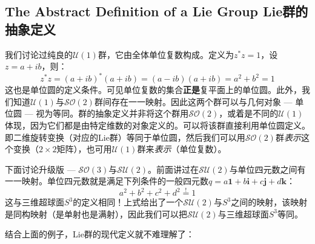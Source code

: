 \subsection[Lie群的抽象定义]{The Abstract Definition of a Lie Group \quad Lie群的抽象定义}
\label{sec3.4.4}
我们讨论过纯良的$\mathcal{U}(1)$群，它由全体单位复数构成。定义为$z^* z = 1$，设$z = a + ib$，则：
\begin{equation}
\label{equ3.84}
z^* z = (a + ib)^* (a + ib) = (a - ib)(a + ib) = a^2 + b^2 = 1
\end{equation}
这也是单位圆的定义条件。可见单位复数的集合{\bf 正是}复平面上的单位圆。此外，我们知道$\mathcal{U}(1)$与$\mathcal{SO}(2)$群间存在一一映射。因此这两个群可以与几何对象 --- 单位圆 --- 视为等同。群的抽象定义并非将这个群用$\mathcal{SO}(2)$，或着是不同的$\mathcal{U}(1)$体现，因为它们都是由特定维数的对象定义的。可以将该群直接利用单位圆定义。即二维旋转变换（对应的Lie群）等同于单位圆，然后我们可以用$\mathcal{SO}(2)$群{\it 表示}这个变换（$2 \times 2$矩阵），也可用$\mathcal{U}(1)$群来{\it 表示}（单位复数）。

下面讨论升级版 --- $\mathcal{SO}(3)$与$\mathcal{SU}(2)$。前面讲过在$\mathcal{SU}(2)$与单位四元数之间有一一映射。单位四元数就是满足下列条件的一般四元数$q = a\mathbf{1} + b\mathbf{i} +c\mathbf{j} + d\mathbf{k}$：
\begin{equation}
\label{equ3.85}
a^2 + b^2 + c^2 + d^2 \stackrel{!}{=} 1
\end{equation}
这与三维超球面$S^3$的定义相同！上式给出了一个$\mathcal{SU}(2)$与$S^3$之间的映射，该映射是同构映射（是单射也是满射），因此我们可以把$\mathcal{SU}(2)$与三维超球面$S^3$等同。

结合上面的例子，Lie群的现代定义就不难理解了：

